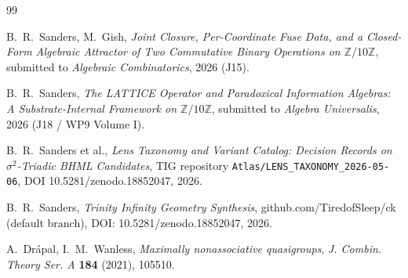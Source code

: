 \documentclass[11pt,reqno]{amsart}
\theoremstyle{plain}
\theoremstyle{definition}
\theoremstyle{remark}
\newcommand{\Z}{\mathbb{Z}}
\newcommand{\sig}{\sigma}
\begin{document}
\begin{thebibliography}{99}

 B.~R.~Sanders, M.~Gish,
\emph{Joint Closure, Per-Coordinate Fuse Data, and a Closed-Form
Algebraic Attractor of Two Commutative Binary Operations on
$\Z/10\Z$}, submitted to \emph{Algebraic Combinatorics}, 2026 (J15).

 B.~R.~Sanders,
\emph{The LATTICE Operator and Paradoxical Information Algebras: A
Substrate-Internal Framework on $\Z/10\Z$}, submitted to
\emph{Algebra Universalis}, 2026 (J18 / WP9 Volume I).

 B.~R.~Sanders et al.,
\emph{Lens Taxonomy and Variant Catalog: Decision Records on
$\sig^{2}$-Triadic BHML Candidates},
TIG repository \texttt{Atlas/LENS\_TAXONOMY\_2026-05-06},
DOI 10.5281/zenodo.18852047, 2026.

 B.~R.~Sanders,
\emph{Trinity Infinity Geometry Synthesis},
github.com/TiredofSleep/ck (default branch),
DOI: 10.5281/zenodo.18852047, 2026.

 A.~Drápal, I.~M.~Wanless,
\emph{Maximally nonassociative quasigroups},
\emph{J. Combin. Theory Ser. A} \textbf{184} (2021), 105510.

\end{thebibliography}
\end{document}
